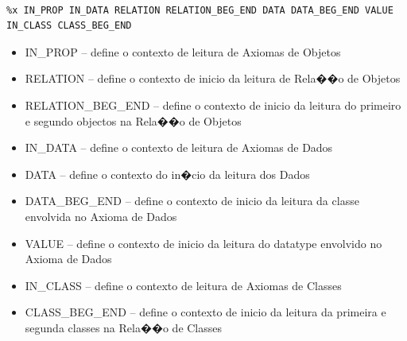 \documentclass{report}
\begin{document}
\begin{lstlisting}

%x IN_PROP IN_DATA RELATION RELATION_BEG_END DATA DATA_BEG_END VALUE IN_CLASS CLASS_BEG_END 
\end{lstlisting}

\begin{itemize}
\item  IN\_PROP  -- define o contexto de leitura de Axiomas de Objetos 
\item RELATION -- define o contexto de inicio da leitura de Rela��o de Objetos 
\item RELATION\_BEG\_END -- define o contexto de inicio  da leitura do primeiro e segundo objectos na Rela��o de Objetos 



\vspace{1cm}
\item IN\_DATA -- define o contexto de leitura de Axiomas de Dados
\item DATA -- define o contexto do in�cio da leitura dos  Dados
\item DATA\_BEG\_END -- define o contexto de inicio  da leitura da classe envolvida no Axioma de Dados 
\item VALUE -- define o contexto de inicio  da leitura do datatype envolvido no Axioma de Dados 

\vspace{1cm}

\item IN\_CLASS -- define o contexto de leitura de Axiomas de Classes
\item CLASS\_BEG\_END -- define o contexto de inicio  da leitura da primeira e segunda classes na Rela��o de Classes 
\end{itemize}
\end{document}

